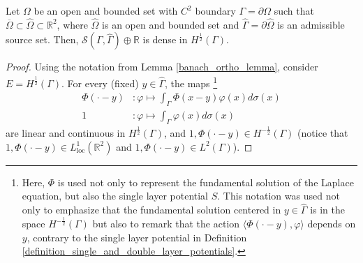 \begin{theorem}\label{MFS_lap_dense}
    Let \(\Omega\) be an open and bounded set with \(C^2\) boundary \(\Gamma = \partial \Omega\) such that \(\overline{\Omega} \subset \hat{\Omega} \subset \mathbb{R}^2\), where \(\hat{\Omega}\) is an open and bounded set and \(\hat{\Gamma} = \partial \hat{\Omega}\) is an admissible source set. Then, \(\mathcal{S}(\Gamma, \hat{\Gamma}) \oplus \mathbb{R}\) is dense in \(H^\frac{1}{2}(\Gamma)\).
\end{theorem}
\begin{proof}
    Using the notation from Lemma \ref{banach_ortho_lemma}, consider $E=H^\frac{1}{2}(\Gamma)$. For every (fixed) \(y \in \hat{\Gamma}\), the maps \footnote{Here, $\Phi$ is used not only to represent the fundamental solution of the Laplace equation, but also the single layer potential $S$. This notation was used not only to emphasize that the fundamental solution centered in $y \in \hat{\Gamma}$ is in the space $H^{-\frac{1}{2}}(\Gamma)$ but also to remark that the action $\langle \Phi(\cdot - y), \varphi \rangle$ depends on $y$, contrary to the single layer potential in Definition \ref{definition_single_and_double_layer_potentials}.}
    \begin{align*}
        \Phi(\cdot-y)&: \varphi \mapsto \int_\Gamma \Phi(x-y)\varphi(x) d\sigma(x)\\
        1&: \varphi \mapsto \int_\Gamma \varphi (x) d\sigma(x)
    \end{align*}
    are linear and continuous in \(H^\frac{1}{2}(\Gamma)\), and \(1, \Phi(\cdot-y) \in H^{-\frac{1}{2}}(\Gamma)\) (notice that \(1, \Phi(\cdot-y) \in L^1_{\text{loc}}(\mathbb{R}^2)\) and \(1, \Phi(\cdot-y) \in L^2({\Gamma})\)).


\end{proof}
